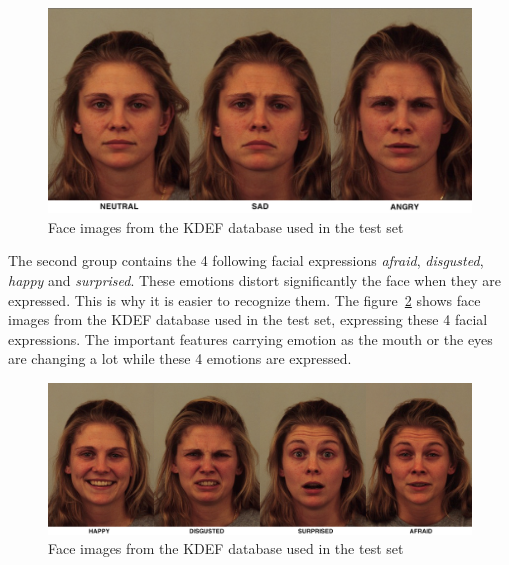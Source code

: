 \begin{figure}[!h]
\begin{center}
\noindent \includegraphics[scale=0.4]{figures/kdef_no_difference_emotions} 
\newline
\caption{Face images from the KDEF database used in the test set}
\label{kdef_no_difference_emotions}
\end{center} 
\end{figure}

\noindent The second group contains the 4 following facial expressions \textit{afraid}, \textit{disgusted}, \textit{happy} and \textit{surprised}. These emotions distort significantly the face when they are expressed. This is why it is easier to recognize them. The figure~\ref{kdef_difference_emotions} shows face images from the KDEF database used in the test set, expressing these 4 facial expressions. The important features carrying emotion as the mouth or the eyes are changing a lot while these 4 emotions are expressed.
\newline

\begin{figure}[!h]
\begin{center}
\noindent \includegraphics[scale=0.3]{figures/kdef_difference_emotions} 
\newline
\caption{Face images from the KDEF database used in the test set}
\label{kdef_difference_emotions}
\end{center} 
\end{figure}

